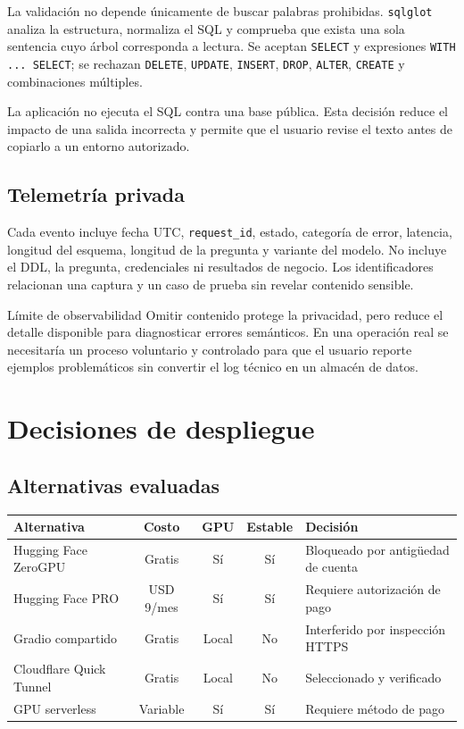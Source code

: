 \documentclass[11pt,letterpaper]{article}
\newcommand{\code}[1]{\texttt{#1}}
\begin{document}
La validación no depende únicamente de buscar palabras prohibidas. \code{sqlglot} analiza la
estructura, normaliza el SQL y comprueba que exista una sola sentencia cuyo árbol corresponda a
lectura. Se aceptan \code{SELECT} y expresiones \code{WITH ... SELECT}; se rechazan \code{DELETE},
\code{UPDATE}, \code{INSERT}, \code{DROP}, \code{ALTER}, \code{CREATE} y combinaciones múltiples.

La aplicación no ejecuta el SQL contra una base pública. Esta decisión reduce el impacto de una
salida incorrecta y permite que el usuario revise el texto antes de copiarlo a un entorno autorizado.

\subsection{Telemetría privada}

Cada evento incluye fecha UTC, \code{request\_id}, estado, categoría de error, latencia, longitud del
esquema, longitud de la pregunta y variante del modelo. No incluye el DDL, la pregunta, credenciales
ni resultados de negocio. Los identificadores relacionan una captura y un caso de prueba sin revelar
contenido sensible.

\begin{advertencia}{Límite de observabilidad}
Omitir contenido protege la privacidad, pero reduce el detalle disponible para diagnosticar errores
semánticos. En una operación real se necesitaría un proceso voluntario y controlado para que el
usuario reporte ejemplos problemáticos sin convertir el log técnico en un almacén de datos.
\end{advertencia}

\section{Decisiones de despliegue}

\subsection{Alternativas evaluadas}

\begin{tabularx}{\textwidth}{@{}lcccX@{}}
\toprule
\textbf{Alternativa} & \textbf{Costo} & \textbf{GPU} & \textbf{Estable} & \textbf{Decisión}\\
\midrule
Hugging Face ZeroGPU & Gratis & Sí & Sí & Bloqueado por antigüedad de cuenta\\
Hugging Face PRO & USD 9/mes & Sí & Sí & Requiere autorización de pago\\
Gradio compartido & Gratis & Local & No & Interferido por inspección HTTPS\\
Cloudflare Quick Tunnel & Gratis & Local & No & Seleccionado y verificado\\
GPU serverless & Variable & Sí & Sí & Requiere método de pago\\
\bottomrule
\end{tabularx}
\end{document}
